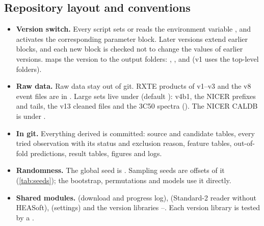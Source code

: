 \subsection{Repository layout and conventions}\label{sec:layout}
\begin{itemize}
\item \textbf{Version switch.} Every script sets or reads the environment variable , and
 activates the corresponding parameter block. Later versions extend earlier blocks, and each new
block is checked not to change the values of earlier versions.  maps the version to the output
folders: , ,  and  (v1 uses the top-level folders).
\item \textbf{Raw data.} Raw data stay out of git. RXTE products of v1--v3 and the v8 event files are in
. Large sets live under  (default ): v4b1, the NICER
prefixes and tails, the v13 cleaned files and the 3C50 spectra (). The NICER
CALDB is under .
\item \textbf{In git.} Everything derived is committed: source and candidate tables, every tried observation with its
status and exclusion reason, feature tables, out-of-fold predictions, result tables, figures and logs.
\item \textbf{Randomness.} The global seed is . Sampling seeds are offsets of it (\cref{tab:seeds}); the
bootstrap, permutations and models use it directly.
\item \textbf{Shared modules.}  (download and progress log),  (Standard-2 reader without
HEASoft),  (settings) and the version libraries --. Each version library
is tested by a .
\end{itemize}
